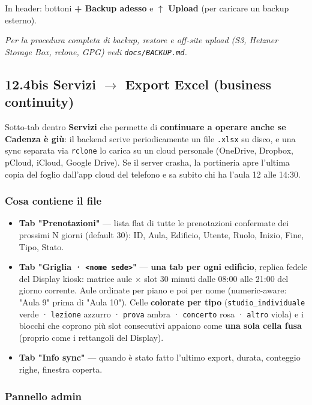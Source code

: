 \documentclass[11pt,a4paper]{article}
\renewenvironment{quote}
  {\begin{list}{}{%
      \setlength{\leftmargin}{8pt}%
      \setlength{\rightmargin}{8pt}%
      \setlength{\topsep}{6pt}%
      \setlength{\parsep}{0pt}}%
      \item\relax\color{black!75}\itshape}
  {\end{list}}
\begin{document}
In header: bottoni \textbf{+ Backup adesso} e \textbf{$\uparrow$ Upload} (per caricare un backup esterno).

\begin{quote}
Per la procedura completa di backup, restore e off-site upload (S3, Hetzner Storage Box, rclone, GPG) vedi \texttt{docs/BACKUP.md}.
\end{quote}

\subsection{12.4bis Servizi $\rightarrow$ Export Excel (business continuity)}


Sotto-tab dentro \textbf{Servizi} che permette di \textbf{continuare a operare anche se Cadenza è giù}: il backend scrive periodicamente un file \texttt{.xlsx} su disco, e una sync separata via \texttt{rclone} lo carica su un cloud personale (OneDrive, Dropbox, pCloud, iCloud, Google Drive). Se il server crasha, la portineria apre l'ultima copia del foglio dall'app cloud del telefono e sa subito chi ha l'aula 12 alle 14:30.

\subsubsection{Cosa contiene il file}


\begin{itemize}
  \item \textbf{Tab "Prenotazioni"} --- lista flat di tutte le prenotazioni confermate dei prossimi N giorni (default 30): ID, Aula, Edificio, Utente, Ruolo, Inizio, Fine, Tipo, Stato.
  \item \textbf{Tab "Griglia · \texttt{\textless{}nome sede\textgreater{}}"} --- \textbf{una tab per ogni edificio}, replica fedele del Display kiosk: matrice aule × slot 30 minuti dalle 08:00 alle 21:00 del giorno corrente. Aule ordinate per piano e poi per nome (numeric-aware: "Aula 9" prima di "Aula 10"). Celle \textbf{colorate per tipo} (\texttt{studio\_individuale} verde · \texttt{lezione} azzurro · \texttt{prova} ambra · \texttt{concerto} rosa · \texttt{altro} viola) e i blocchi che coprono più slot consecutivi appaiono come \textbf{una sola cella fusa} (proprio come i rettangoli del Display).
  \item \textbf{Tab "Info sync"} --- quando è stato fatto l'ultimo export, durata, conteggio righe, finestra coperta.
\end{itemize}

\subsubsection{Pannello admin}
\end{document}
